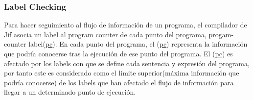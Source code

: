\subsubsection{Label Checking}
Para hacer seguimiento al flujo de información de un programa, el compilador de
Jif asocia un label al program counter de cada punto del programa,
progam-counter label(\underline{pc}). En cada punto del programa, el
(\underline{pc}) representa la información que podría conocerse tras la
ejecución de ese punto del programa.
El (\underline{pc}) es afectado por los labels con que se define cada sentencia
y expresión del programa, por tanto este es considerado como el límite
superior(máxima información que podría conocerse) de los labels que han afectado
el flujo de información para llegar a un determinado punto de ejecución.\newline
